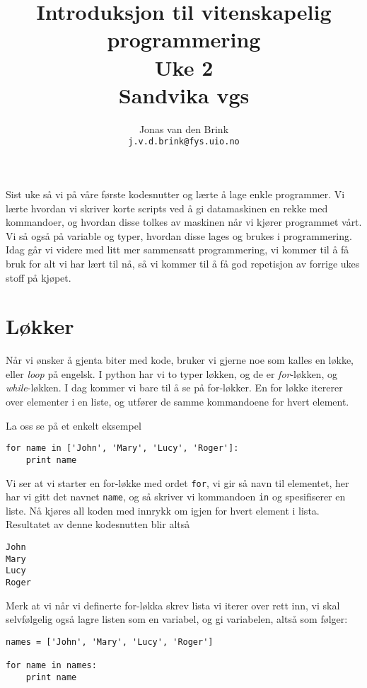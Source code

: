 \documentclass[a4paper, 11pt, notitlepage, english]{article}
\author{Jonas van den Brink \\ \texttt{j.v.d.brink@fys.uio.no}}
\title{Introduksjon til vitenskapelig programmering \\ Uke 2 \\ Sandvika vgs}
\begin{document}
\maketitle

Sist uke så vi på våre første kodesnutter og lærte å lage enkle programmer. Vi lærte hvordan vi skriver korte scripts ved å gi datamaskinen en rekke med kommandoer, og hvordan disse tolkes av maskinen når vi kjører programmet vårt. Vi så også på variable og typer, hvordan disse lages og brukes i programmering. Idag går vi videre med litt mer sammensatt programmering, vi kommer til å få bruk for alt vi har lært til nå, så vi kommer til å få god repetisjon av forrige ukes stoff på kjøpet. 

\clearpage

\section{Løkker}
Når vi ønsker å gjenta biter med kode, bruker vi gjerne noe som kalles en løkke, eller \emph{loop} på engelsk. I python har vi to typer løkken, og de er \emph{for}-løkken, og \emph{while}-løkken. I dag kommer vi bare til å se på for-løkker. En for løkke itererer over elementer i en liste, og utfører de samme kommandoene for hvert element.

La oss se på et enkelt eksempel
\begin{lstlisting}
for name in ['John', 'Mary', 'Lucy', 'Roger']:
    print name    
\end{lstlisting}
\vspace{-0.3cm}
Vi ser at vi starter en for-løkke med ordet \verb+for+, vi gir så navn til elementet, her har vi gitt det navnet \verb+name+, og så skriver vi kommandoen \verb+in+ og spesifiserer en liste. Nå kjøres all koden med innrykk om igjen for hvert element i lista. Resultatet av denne kodesnutten blir altså
\begin{lstlisting}
John
Mary
Lucy
Roger
\end{lstlisting}
\vspace{-0.3cm}
Merk at vi når vi definerte for-løkka skrev lista vi iterer over rett inn, vi skal selvfølgelig også lagre listen som en variabel, og gi variabelen, altså som følger:
\begin{lstlisting}
names = ['John', 'Mary', 'Lucy', 'Roger']

for name in names:
    print name    
\end{lstlisting}
\vspace{-0.3cm}
\end{document}
